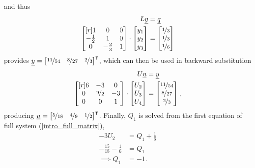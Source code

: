 and thus
\begin{align*}
  L\underline{y} &= \underline{q} \\
  \begin{bmatrix}[r]
     1           &  0           &  0 \\
    -\frac{1}{2} &  1           &  0 \\
     0           & -\frac{2}{3} &  1 \\
  \end{bmatrix} \cdot
  \begin{bmatrix} y_1 \\ y_2 \\ y_3 \end{bmatrix} &=
  \begin{bmatrix} \nicefrac{1}{3} \\ \nicefrac{1}{3} \\ \nicefrac{1}{6} \end{bmatrix}
\end{align*}
provides $\underline{y} = \begin{bmatrix} \nicefrac{11}{54} & \nicefrac{8}{27} & \nicefrac{2}{3} \end{bmatrix}^\intercal$, which can then be used in backward substitution
\begin{align*}
  U\underline{u} &= \underline{y} \\
  \begin{bmatrix}[r]
     6 & -3               &  0 \\
     0 &  \nicefrac{9}{2} & -3 \\
     0 &  0               &  1 \\
  \end{bmatrix} \cdot
  \begin{bmatrix} U_2 \\ U_3 \\ U_4 \end{bmatrix} &=
  \begin{bmatrix} \nicefrac{11}{54} \\ \nicefrac{8}{27} \\ \nicefrac{2}{3} \end{bmatrix},
\end{align*}
producing $\underline{u} = \begin{bmatrix} \nicefrac{5}{18} & \nicefrac{4}{9} & \nicefrac{1}{2} \end{bmatrix}^\intercal$.  Finally, $Q_1$ is solved from the first equation of full system (\ref{intro_full_matrix}),
\begin{align*}
  -3U_2 &= Q_1 + \frac{1}{6} \\
  -\frac{15}{18} - \frac{1}{6} &= Q_1 \\
  \implies Q_1 &= - 1.
\end{align*}

